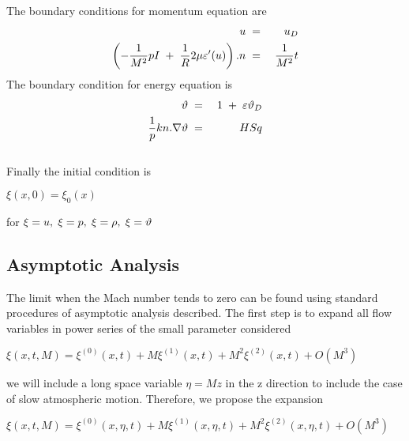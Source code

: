 \documentclass[11pt,a4paper]{article}
\begin{document}
The boundary conditions for momentum equation are
\begin{eqnarray}
u\hspace{1mm}&=& \hspace{1mm}u_D \\
\left(-\frac{1}{M^2}pI\hspace{1mm}+\hspace{1mm}\frac{1}{R}2\mu\varepsilon'(u)\right).n\hspace{1mm}&=&\hspace{1mm}\frac{1}{M^2}t \\
\end{eqnarray}
The boundary condition for energy equation is
\begin{eqnarray}
\vartheta\hspace{1mm}&=&\hspace{1mm}1\hspace{1mm}+\hspace{1mm}\varepsilon\vartheta_D \\
\frac{1}{p}kn.\nabla\vartheta\hspace{1mm}&=& \hspace{1mm}HSq \\
\end{eqnarray} \\
Finally the initial condition is

 $\xi(x,0)=\xi_0 (x)$

for $\xi=u,\hspace{1mm} \xi=p,\hspace{1mm} \xi=\rho, \hspace{1mm} \xi=\vartheta$ 
\subsection{Asymptotic Analysis}

The limit when the Mach number tends to zero can be found using standard
procedures of asymptotic analysis described. The first step
is to expand all flow variables in power series of the small parameter considered 

$\xi(x,t,M)=\xi^{(0)}(x,t)+M\xi^{(1)}(x,t)+M^2\xi^{(2)}(x,t)+ O(M^3)$ 


\noindent we will include a long space variable $\eta=Mz $ in the z direction to include the
case of slow atmospheric motion. Therefore, we propose the
expansion



$\xi(x,t,M)=\xi^{(0)}(x,\eta,t)+M\xi^{(1)}(x,\eta,t)+M^2\xi^{(2)}(x,\eta,t)+ O(M^3)$ 
\end{document}
